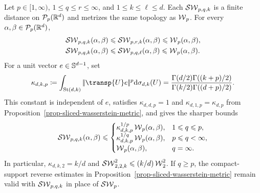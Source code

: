 \begin{prop}\label{prop-sliced-variant-bounds}
Let $p\in[1,\infty)$, $1\leq q\leq r\leq\infty$, and
$1\leq k\leq \ell\leq d$. Each $\operatorname{\mathcal{SW}}_{p,q,k}$ is a finite distance on
$\mathcal{P}_p(\mathbb{R}^d)$ and metrizes the same topology as $\operatorname{\mathcal{W}}_p$. For every
$\alpha,\beta\in\mathcal{P}_p(\mathbb{R}^d)$,
\begin{align}
\operatorname{\mathcal{SW}}_{p,q,k}(\alpha,\beta)
&\leqslant
\operatorname{\mathcal{SW}}_{p,r,k}(\alpha,\beta)
\leqslant
\operatorname{\mathcal{W}}_p(\alpha,\beta),
\label{eq-lq-sliced-monotonicity}\\
\operatorname{\mathcal{SW}}_{p,q,k}(\alpha,\beta)
&\leqslant
\operatorname{\mathcal{SW}}_{p,q,\ell}(\alpha,\beta)
\leqslant
\operatorname{\mathcal{W}}_p(\alpha,\beta).
\label{eq-subspace-dimension-monotonicity}
\end{align}
For a unit vector $e\in\mathbb{S}^{d-1}$, set
\[
\kappa_{d,k,p}
\eqdef
\int_{\mathrm{St}(d,k)}\norm{\transp{U}e}^p\d\sigma_{d,k}(U)
=
\frac{\Gamma(d/2)\Gamma((k+p)/2)}
{\Gamma(k/2)\Gamma((d+p)/2)}.
\]
This constant is independent of $e$, satisfies $\kappa_{d,d,p}=1$ and
$\kappa_{d,1,p}=\kappa_{d,p}$ from
Proposition~\ref{prop-sliced-wasserstein-metric}, and gives the sharper bounds
\begin{equation}\label{eq-lq-subspace-sliced-upper-bound}
\operatorname{\mathcal{SW}}_{p,q,k}(\alpha,\beta)
\leqslant
\begin{cases}
\kappa_{d,k,p}^{1/p}\operatorname{\mathcal{W}}_p(\alpha,\beta), & 1\leqslant q\leqslant p,\\
\kappa_{d,k,p}^{1/q}\operatorname{\mathcal{W}}_p(\alpha,\beta), & p\leqslant q<\infty,\\
\operatorname{\mathcal{W}}_p(\alpha,\beta), & q=\infty.
\end{cases}
\end{equation}
In particular, $\kappa_{d,k,2}=k/d$ and
$\operatorname{\mathcal{SW}}_{2,2,k}^2\leqslant(k/d)\operatorname{\mathcal{W}}_2^2$. If $q\geq p$, the compact-support reverse
estimates in Proposition~\ref{prop-sliced-wasserstein-metric} remain valid
with $\operatorname{\mathcal{SW}}_{p,q,k}$ in place of $\operatorname{\mathcal{SW}}_p$.
\end{prop}
